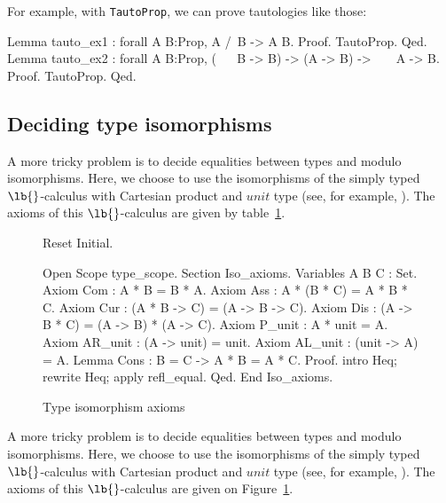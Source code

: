 For example, with {\tt TautoProp}, we can prove tautologies like
 those:
\begin{coq_example*}
Lemma tauto_ex1 : forall A B:Prop, A /\ B -> A \/ B.
Proof. TautoProp. Qed.
Lemma tauto_ex2 :
   forall A B:Prop, (~ ~ B -> B) -> (A -> B) -> ~ ~ A -> B.
Proof. TautoProp. Qed.
\end{coq_example*}

\subsection{Deciding type isomorphisms}

A more tricky problem is to decide equalities between types and modulo
isomorphisms. Here, we choose to use the isomorphisms of the simply typed
$\lb{}$-calculus with Cartesian product and $unit$ type (see, for example,
\cite{RC95}). The axioms of this $\lb{}$-calculus are given by
table~\ref{isosax}.

\begin{figure}
\begin{centerframe}
\begin{coq_eval}
Reset Initial.
\end{coq_eval}
\begin{coq_example*}
Open Scope type_scope.
Section Iso_axioms.
Variables A B C : Set.
Axiom Com : A * B = B * A.
Axiom Ass : A * (B * C) = A * B * C.
Axiom Cur : (A * B -> C) = (A -> B -> C).
Axiom Dis : (A -> B * C) = (A -> B) * (A -> C).
Axiom P_unit : A * unit = A.
Axiom AR_unit : (A -> unit) = unit.
Axiom AL_unit : (unit -> A) = A.
Lemma Cons : B = C -> A * B = A * C.
Proof.
intro Heq; rewrite Heq; apply refl_equal.
Qed.
End Iso_axioms.
\end{coq_example*}
\end{centerframe}
\caption{Type isomorphism axioms}
\label{isosax}
\end{figure}

A more tricky problem is to decide equalities between types and modulo
isomorphisms. Here, we choose to use the isomorphisms of the simply typed
$\lb{}$-calculus with Cartesian product and $unit$ type (see, for example,
\cite{RC95}). The axioms of this $\lb{}$-calculus are given on
Figure~\ref{isosax}.


